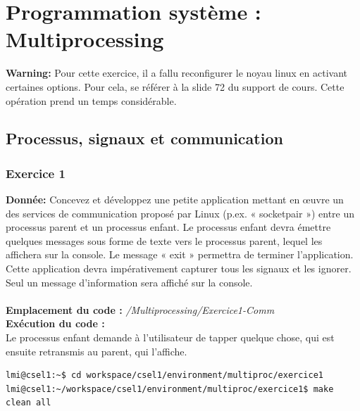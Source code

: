 \section{Programmation système : Multiprocessing}
\textbf{Warning: } Pour cette exercice, il a fallu reconfigurer le noyau linux en activant certaines options. Pour cela, se référer à la slide 72 du support de cours. Cette opération prend un temps considérable.
\subsection{Processus, signaux et communication}
\subsubsection{Exercice 1}
\textbf{Donnée:} Concevez	et	développez	une	petite	application	mettant	en	œuvre	un	des	services	de	communication
proposé	par	Linux	(p.ex.	« socketpair ») entre	un	processus	parent	et	un	processus	enfant.	
Le	processus	enfant	devra	émettre	quelques	messages	sous	forme	de	texte	vers	le	processus	parent,	
lequel	les	affichera	sur	la	console.	Le	message	« exit »	permettra	de	terminer	l’application.
Cette	application	devra	impérativement	capturer	tous	les	signaux	et	les	ignorer.	Seul	un	message	
d’information	sera	affiché	sur	la	console.\\\\
\textbf{Emplacement du code : } \textit{/Multiprocessing/Exercice1-Comm}\\

\textbf{Exécution du code : } \\
Le processus enfant demande à l'utilisateur de tapper quelque chose, qui est ensuite retransmis au parent, qui l'affiche. \\
\begin{lstlisting}
lmi@csel1:~$ cd workspace/csel1/environment/multiproc/exercice1
lmi@csel1:~/workspace/csel1/environment/multiproc/exercice1$ make clean all
\end{lstlisting}

